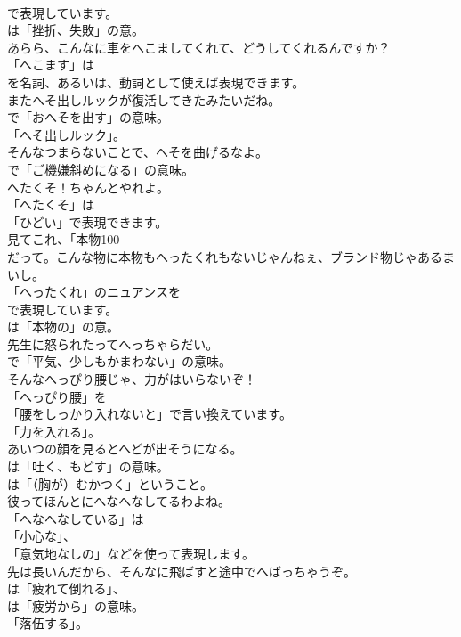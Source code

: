 \documentclass[8pt]{extreport}
\begin{document}
\begin{CJK}{UTF8}{min}
\\	で表現しています。
\\	は「挫折、失敗」の意。	
\\	あらら、こんなに車をへこましてくれて、どうしてくれるんですか？ 
\\	「へこます」は
\\	を名詞、あるいは、動詞として使えば表現できます。	
\\	またへそ出しルックが復活してきたみたいだね。 
\\	で「おへそを出す」の意味。
\\	「へそ出しルック」。	
\\	そんなつまらないことで、へそを曲げるなよ。 
\\	で「ご機嫌斜めになる」の意味。	
\\	へたくそ！ちゃんとやれよ。 
\\	「へたくそ」は
\\	「ひどい」で表現できます。	
\\	見てこれ、「本物100
\\	だって。こんな物に本物もへったくれもないじゃんねぇ、ブランド物じゃあるまいし。 
\\	「へったくれ」のニュアンスを 
\\	で表現しています。
\\	は「本物の」の意。	
\\	先生に怒られたってへっちゃらだい。 
\\	で「平気、少しもかまわない」の意味。	
\\	そんなへっぴり腰じゃ、力がはいらないぞ！ 
\\	「へっぴり腰」を
\\	「腰をしっかり入れないと」で言い換えています。
\\	「力を入れる」。	
\\	あいつの顔を見るとへどが出そうになる。 
\\	は「吐く、もどす」の意味。
\\	は「（胸が）むかつく」ということ。	
\\	彼ってほんとにへなへなしてるわよね。 
\\	「へなへなしている」は
\\	「小心な」、
\\	「意気地なしの」などを使って表現します。	
\\	先は長いんだから、そんなに飛ばすと途中でへばっちゃうぞ。 
\\	は「疲れて倒れる」、
\\	は「疲労から」の意味。
\\	「落伍する」。	

\end{CJK}
\end{document}
